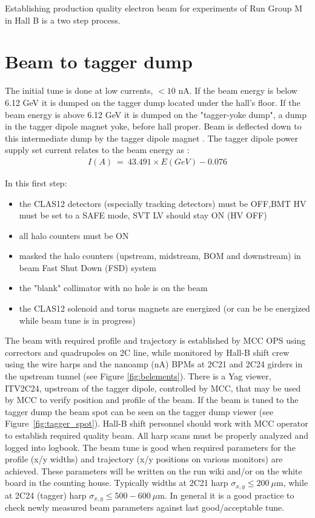 \indent

Establishing production quality electron beam for experiments of Run Group M in Hall B is a two step process. 

\section{Beam to tagger  dump}
\indent

The initial tune is done at low currents, $<10$ nA. If the beam energy is below 6.12 GeV it is dumped on the tagger dump located under the hall's floor. If the beam energy is above 6.12 GeV  it is dumped on the "tagger-yoke dump", a dump in the tagger dipole magnet yoke, before hall proper. Beam is deflected down to this intermediate dump by the tagger dipole magnet \cite{tagger}. The tagger dipole power supply set current relates to the beam energy as \cite{yokedump}:
\begin{eqnarray}
I(A)~=~43.491\times E(GeV)-0.076
\end{eqnarray}


In this first step:
\begin{itemize}
\item the CLAS12 detectors (especially tracking detectors) must be OFF,BMT HV must be set to a SAFE mode, SVT LV should stay ON (HV OFF)
\item all halo counters must be ON
\item masked the halo counters (upstream, midstream, BOM and downstream) in beam Fast Shut Down (FSD) system 
\item the "blank" collimator with no hole is on the beam
\item the CLAS12 solenoid and torus magnets are energized (or can be be energized while beam tune is in progress)
\end{itemize}

The beam with required profile and trajectory is established by MCC OPS using correctors and quadrupoles on 2C line, while monitored by Hall-B shift crew using the wire harps and the nanoamp (nA) BPMs \cite{nA_BPM} at 2C21 and 2C24 girders in the upstream tunnel (see  Figure \ref{fig:belements}). There is a Yag viewer, ITV2C24, upstream of the tagger dipole, controlled by MCC, that may be used by MCC to verify position and profile of the beam. If the beam is tuned to the tagger dump the beam spot can be seen on the tagger dump viewer (see Figure~\ref{fig:tagger_spot}). 
Hall-B shift personnel should work with MCC operator to establish required quality beam. All harp scans must be properly analyzed and logged into logbook. The beam tune is good when required parameters for the profile (x/y widths) and trajectory (x/y positions on various monitors) are achieved. These parameters will be written on the run wiki and/or on the white board in the counting house. Typically widths at 2C21 harp $\sigma_{x,y}\le 200~\mu$m, while at 2C24 (tagger) harp $\sigma_{x,y}\le 500-600~\mu$m. In general it is a good practice to check newly measured beam parameters against last good/acceptable tune.  

